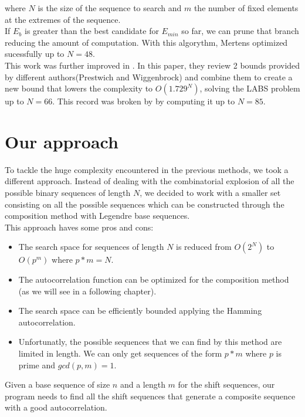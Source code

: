   where $N$ is the size of the sequence to search and $m$ the number of fixed
  elements at the extremes of the sequence.\\

  If $E_b$ is greater than the best candidate for $E_{min}$ so far, we can
  prune that branch reducing the amount of computation. With this algorythm,
  Mertens optimized sucessfully up to $N = 48$.\\

  This work was further improved in \citet{Packebusch_2016}. In this paper,
  they review 2 bounds provided by different authors(Prestwich and
  Wiggenbrock) and combine them to create a new bound that lowers the
  complexity to $O(1.729^N)$, solving the LABS problem up to $N = 66$. This
  record was broken by \citet{anatoli} by computing it up to $N = 85$.\\

  \section{Our approach}

  To tackle the huge complexity encountered in the previous methods, we took
  a different approach. Instead of dealing with the combinatorial explosion
  of all the possible binary sequences of length $N$, we decided to work with
  a smaller set consisting on all the possible sequences which can be
  constructed through the composition method with Legendre base sequences.\\

  This approach haves some pros and cons:

  \begin{itemize}
    \item The search space for sequences of length $N$ is reduced from $O(2^N)$
          to $O(p^m)$ where $p*m = N$.
    \item The autocorrelation function can be optimized for the composition
          method (as we will see in a following chapter).
    \item The search space can be efficiently bounded applying the Hamming
          autocorrelation.
    \item Unfortunatly, the possible sequences that we can find by this method
          are limited in length. We can only get sequences of the form $p * m$
          where $p$ is prime and $gcd(p, m) = 1$.
  \end{itemize}

  Given a base sequence of size $n$ and a length $m$ for the shift sequences,
  our program needs to find all the shift sequences that generate a composite
  sequence with a good autocorrelation.\\

